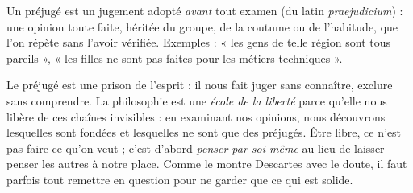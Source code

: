 \documentclass[11pt]{article}
\newcommand{\cle}[1]{{\popxbold\color{popdark}#1}}
\begin{document}
\begin{definition}[Le préjugé]
Un \cle{préjugé} est un jugement adopté \emph{avant} tout examen (du latin \emph{praejudicium}) : une opinion toute faite, héritée du groupe, de la coutume ou de l'habitude, que l'on répète sans l'avoir vérifiée. Exemples : « les gens de telle région sont tous pareils », « les filles ne sont pas faites pour les métiers techniques ».
\end{definition}

Le préjugé est une prison de l'esprit : il nous fait juger sans connaître, exclure sans comprendre. La philosophie est une \emph{école de la liberté} parce qu'elle nous libère de ces chaînes invisibles : en examinant nos opinions, nous découvrons lesquelles sont fondées et lesquelles ne sont que des préjugés. Être libre, ce n'est pas faire ce qu'on veut ; c'est d'abord \emph{penser par soi-même} au lieu de laisser penser les autres à notre place. Comme le montre Descartes avec le doute, il faut parfois tout remettre en question pour ne garder que ce qui est solide.
\end{document}
